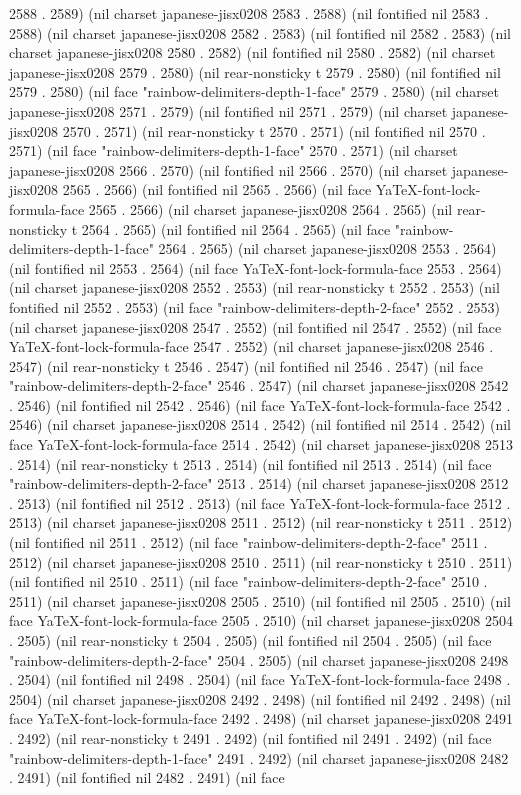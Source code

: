 2588 . 2589) (nil charset japanese-jisx0208 2583 . 2588) (nil fontified nil 2583 . 2588) (nil charset japanese-jisx0208 2582 . 2583) (nil fontified nil 2582 . 2583) (nil charset japanese-jisx0208 2580 . 2582) (nil fontified nil 2580 . 2582) (nil charset japanese-jisx0208 2579 . 2580) (nil rear-nonsticky t 2579 . 2580) (nil fontified nil 2579 . 2580) (nil face "rainbow-delimiters-depth-1-face" 2579 . 2580) (nil charset japanese-jisx0208 2571 . 2579) (nil fontified nil 2571 . 2579) (nil charset japanese-jisx0208 2570 . 2571) (nil rear-nonsticky t 2570 . 2571) (nil fontified nil 2570 . 2571) (nil face "rainbow-delimiters-depth-1-face" 2570 . 2571) (nil charset japanese-jisx0208 2566 . 2570) (nil fontified nil 2566 . 2570) (nil charset japanese-jisx0208 2565 . 2566) (nil fontified nil 2565 . 2566) (nil face YaTeX-font-lock-formula-face 2565 . 2566) (nil charset japanese-jisx0208 2564 . 2565) (nil rear-nonsticky t 2564 . 2565) (nil fontified nil 2564 . 2565) (nil face "rainbow-delimiters-depth-1-face" 2564 . 2565) (nil charset japanese-jisx0208 2553 . 2564) (nil fontified nil 2553 . 2564) (nil face YaTeX-font-lock-formula-face 2553 . 2564) (nil charset japanese-jisx0208 2552 . 2553) (nil rear-nonsticky t 2552 . 2553) (nil fontified nil 2552 . 2553) (nil face "rainbow-delimiters-depth-2-face" 2552 . 2553) (nil charset japanese-jisx0208 2547 . 2552) (nil fontified nil 2547 . 2552) (nil face YaTeX-font-lock-formula-face 2547 . 2552) (nil charset japanese-jisx0208 2546 . 2547) (nil rear-nonsticky t 2546 . 2547) (nil fontified nil 2546 . 2547) (nil face "rainbow-delimiters-depth-2-face" 2546 . 2547) (nil charset japanese-jisx0208 2542 . 2546) (nil fontified nil 2542 . 2546) (nil face YaTeX-font-lock-formula-face 2542 . 2546) (nil charset japanese-jisx0208 2514 . 2542) (nil fontified nil 2514 . 2542) (nil face YaTeX-font-lock-formula-face 2514 . 2542) (nil charset japanese-jisx0208 2513 . 2514) (nil rear-nonsticky t 2513 . 2514) (nil fontified nil 2513 . 2514) (nil face "rainbow-delimiters-depth-2-face" 2513 . 2514) (nil charset japanese-jisx0208 2512 . 2513) (nil fontified nil 2512 . 2513) (nil face YaTeX-font-lock-formula-face 2512 . 2513) (nil charset japanese-jisx0208 2511 . 2512) (nil rear-nonsticky t 2511 . 2512) (nil fontified nil 2511 . 2512) (nil face "rainbow-delimiters-depth-2-face" 2511 . 2512) (nil charset japanese-jisx0208 2510 . 2511) (nil rear-nonsticky t 2510 . 2511) (nil fontified nil 2510 . 2511) (nil face "rainbow-delimiters-depth-2-face" 2510 . 2511) (nil charset japanese-jisx0208 2505 . 2510) (nil fontified nil 2505 . 2510) (nil face YaTeX-font-lock-formula-face 2505 . 2510) (nil charset japanese-jisx0208 2504 . 2505) (nil rear-nonsticky t 2504 . 2505) (nil fontified nil 2504 . 2505) (nil face "rainbow-delimiters-depth-2-face" 2504 . 2505) (nil charset japanese-jisx0208 2498 . 2504) (nil fontified nil 2498 . 2504) (nil face YaTeX-font-lock-formula-face 2498 . 2504) (nil charset japanese-jisx0208 2492 . 2498) (nil fontified nil 2492 . 2498) (nil face YaTeX-font-lock-formula-face 2492 . 2498) (nil charset japanese-jisx0208 2491 . 2492) (nil rear-nonsticky t 2491 . 2492) (nil fontified nil 2491 . 2492) (nil face "rainbow-delimiters-depth-1-face" 2491 . 2492) (nil charset japanese-jisx0208 2482 . 2491) (nil fontified nil 2482 . 2491) (nil face 